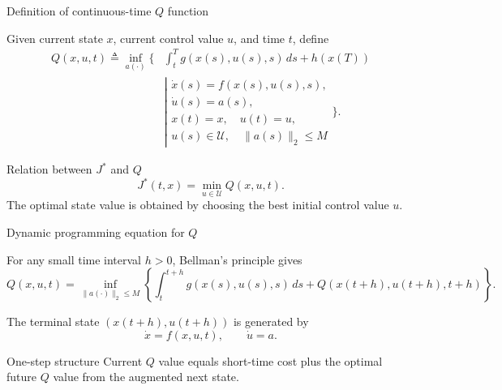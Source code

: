 \documentclass[aspectratio=169]{beamer}
\begin{document}
\begin{frame}{Definition of continuous-time \(Q\) function}

Given current state \(x\), current control value \(u\), and time \(t\), define
\[
\begin{aligned}
Q(x,u,t)
\triangleq
\inf_{a(\cdot)}
\Bigg\{
&\int_t^T g(x(s),u(s),s)\,ds+h(x(T))
\\
&\left|
\begin{array}{l}
\dot{x}(s)=f(x(s),u(s),s),\\
\dot{u}(s)=a(s),\\
x(t)=x,\quad u(t)=u,\\
u(s)\in\mathcal U,\quad \|a(s)\|_2\le M
\end{array}
\right.
\Bigg\}.
\end{aligned}
\]

\vspace{0.15cm}

\begin{block}{Relation between \(J^*\) and \(Q\)}
\[
J^*(t,x)=\min_{u\in\mathcal U}Q(x,u,t).
\]
\small
The optimal state value is obtained by choosing the best initial control value \(u\).
\end{block}

\end{frame}


\begin{frame}{Dynamic programming equation for \(Q\)}

For any small time interval \(h>0\), Bellman's principle gives
\[
Q(x,u,t)
=
\inf_{\|a(\cdot)\|_2\le M}
\left\{
\int_t^{t+h}g(x(s),u(s),s)\,ds
+
Q(x(t+h),u(t+h),t+h)
\right\}.
\]

\vspace{0.2cm}

The terminal state \((x(t+h),u(t+h))\) is generated by
\[
\dot{x}=f(x,u,t),
\qquad
\dot{u}=a .
\]

\vspace{0.2cm}

\begin{block}{One-step structure}
\small
Current \(Q\) value equals short-time cost plus the optimal future \(Q\) value from the augmented next state.
\end{block}

\end{frame}
\end{document}
